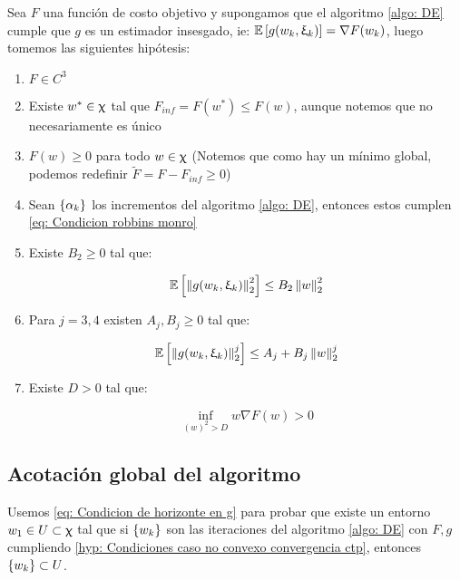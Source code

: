 \begin{hyp}
	\label{hyp: Condiciones caso no convexo convergencia ctp}
	Sea $F$ una funci\'on de costo objetivo y supongamos que el algoritmo \ref{algo: DE} cumple que $g$ es un estimador insesgado, ie: $\mathbb{E} \left[g(w_k, \upxi_{k})\right] = \nabla F(w_k)$, luego tomemos las siguientes hip\'otesis:
	
	\begin{enumerate}
		\item $F \in C^3$
		\item Existe $w^* \in \upchi$ tal que $F_{inf} = F(w^*) \leq F(w)$, aunque notemos que no necesariamente es \'unico
		\item $F(w) \geq 0$ para todo $w \in \upchi$ (Notemos que como hay un m\'inimo global, podemos redefinir $\widetilde{F} = F - F_{inf} \geq 0$)
		\item Sean $\left\lbrace\alpha_k\right\rbrace$ los incrementos del algoritmo \ref{algo: DE}, entonces estos cumplen \ref{eq: Condicion robbins monro}
		\item Existe $B_2 \geq 0$ tal que:
		
		\begin{equation}
		\mathbb{E} \left[\left\lVert g(w_k, \upxi_{k})\right\rVert_2^2\right] \leq B_2 \left\lVert w\right\rVert_2^2
		\end{equation}
		
		\item Para $j = 3, 4$ existen $A_j,B_j \geq 0$ tal que:
		
		\begin{equation}
			\label{eq: Acotaciones momentos de g}
			\mathbb{E} \left[\left\lVert g(w_k, \upxi_{k})\right\rVert_2^j\right] \leq A_j + B_j \left\lVert w\right\rVert_2^j
		\end{equation}
		
		\item  Existe $D > 0$ tal que:
		
		\begin{equation}
			\label{eq: Condicion de horizonte en g}
			\inf\limits_{(w)^2 > D} {w \nabla F(w)} >0
		\end{equation}
	\end{enumerate}
	
\end{hyp}

\subsection{Acotaci\'on global del algoritmo}

Usemos \ref{eq: Condicion de horizonte en g} para probar que existe un entorno $w_1 \in U \subset \upchi$ tal que si $\left\lbrace w_k\right\rbrace$ son las iteraciones del algoritmo \ref{algo: DE} con $F,g$ cumpliendo \ref{hyp: Condiciones caso no convexo convergencia ctp}, entonces $\left\lbrace w_k\right\rbrace \subset U$.

